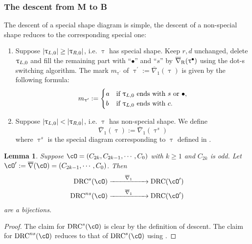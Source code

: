 \documentclass[12pt,a4paper]{amsart}
\def\abs#1{\left|{#1}\right|}
\def\eDD{\overline{\nabla}}
\def\eDDo{\overline{\nabla}_1}
\numberwithin{equation}{section}
\newtheorem{lem}[thm]{Lemma}
\theoremstyle{remark}
\def\drc{\mathrm{DRC}}
\def\drcs{\mathrm{DRC}^{s}}
\def\drcns{\mathrm{DRC}^{ns}}
\def\cOp{\cO^{\prime}}
\def\uptaup{\uptau^{\prime}}
\begin{document}
\subsubsection{The descent from M to B}
The descent of a special shape diagram is simple, the descent of a non-special shape
reduces to the corresponding special one:
\begin{enumerate}[resume*=alg1]
  \item Suppose $\abs{\taulf} \geq \abs{\taurf} $, i.e. $\uptau$ has special
        shape. Keep $r,d$ unchanged, delete $\uptau_{L,0}$ and fill the remaining part
        with ``$\bullet$'' and ``$s$'' by $\DDr(\uptau^{\bullet})$ using the
        dot-s switching algorithm. The mark $m_{\uptaup}$ of
        $\uptaup:=\eDDo(\uptau)$ is given by the following formula:
        \[
        m_{\uptaup}:= \begin{cases}
          a & \text{if  $\taulf$ ends with $s$ or $\bullet$},\\
          b & \text{if $\taulf$ ends with $c$}.
        \end{cases}
        \]

  \item Suppose $\abs{\taulf} < \abs{\taurf}$, i.e. $\uptau$ has non-special
        shape. We define
        \[\eDDo(\uptau):=\eDDo(\uptau^{s})\]
        where $\uptau^{s}$ is the special diagram corresponding to $\uptau$
        defined in .
\end{enumerate}

\begin{lem}\label{lem:ds.BM}
  Suppose $\cO = (C_{2k},C_{2k-1}, \cdots, C_{0})$ with $k\geq 1$ and $C_{2k}$
  is odd.
  Let $\cOp := \eDD(\cO)=(C_{2k-1},\cdots, C_{0})$.
  Then
  \[
    \begin{split}
      \drcs(\cO) &\xrightarrow{\hspace{2em}\eDDo\hspace{2em}} \drc(\cOp) \\
      \drcns(\cO)&
      \xrightarrow{\hspace{2em}\eDDo\hspace{2em}} \drc(\cOp)
    \end{split}
  \]
  are a bijections.
\end{lem}
\begin{proof}
  The claim for $\drcs(\cO)$ is clear by the definition of descent.
  The claim for $\drcns(\cO)$ reduces to that of $\drcs(\cO)$ using .
\end{proof}
\end{document}

